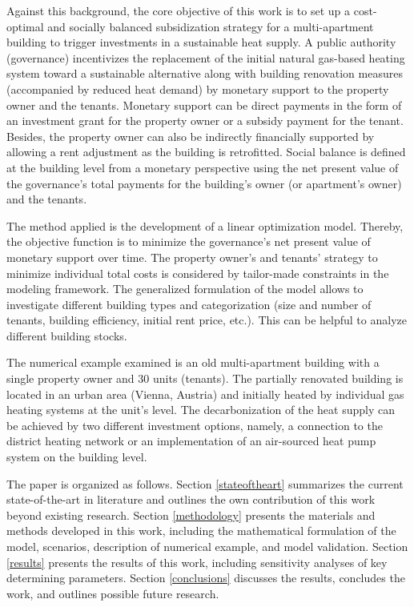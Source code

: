 Against this background, the core objective of this work is to set up a cost-optimal and socially balanced subsidization strategy for a multi-apartment building to trigger investments in a sustainable heat supply. A public authority (governance) incentivizes the replacement of the initial natural gas-based heating system toward a sustainable alternative along with building renovation measures (accompanied by reduced heat demand) by monetary support to the property owner and the tenants. Monetary support can be direct payments in the form of an investment grant for the property owner or a subsidy payment for the tenant. Besides, the property owner can also be indirectly financially supported by allowing a rent adjustment as the building is retrofitted. Social balance is defined at the building level from a monetary perspective using the net present value of the governance's total payments for the building's owner (or apartment's owner) and the tenants.\vspace{0.5cm}

The method applied is the development of a linear optimization model. Thereby, the objective function is to minimize the governance's net present value of monetary support over time. The property owner's and tenants' strategy to minimize individual total costs is considered by tailor-made constraints in the modeling framework. The generalized formulation of the model allows to investigate different building types and categorization (size and number of tenants, building efficiency, initial rent price, etc.). This can be helpful to analyze different building stocks.\vspace{0.5cm}

The numerical example examined is an old multi-apartment building with a single property owner and 30 units (tenants). The partially renovated building is located in an urban area (Vienna, Austria) and initially heated by individual gas heating systems at the unit's level. The decarbonization of the heat supply can be achieved by two different investment options, namely, a connection to the district heating network or an implementation of an air-sourced heat pump system on the building level.\vspace{0.5cm}

The paper is organized as follows. Section \ref{stateoftheart} summarizes the current state-of-the-art in literature and outlines the own contribution of this work beyond existing research. Section \ref{methodology} presents the materials and methods developed in this work, including the mathematical formulation of the model, scenarios, description of numerical example, and model validation. Section \ref{results} presents the results of this work, including sensitivity analyses of key determining parameters. Section \ref{conclusions} discusses the results, concludes the work, and outlines possible future research.